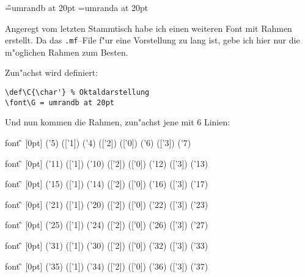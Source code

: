 \newpage\setcounter{page}{1}
\parindent=0pt \parskip=0pt
\font\G=umrandb at 20pt
\font\F=umranda at 20pt
\fussy
{}
\def\C{\char'}

Angeregt vom letzten Stammtisch habe ich einen weiteren Font mit Rahmen
erstellt. Da das {\tt .mf}--File f"ur eine Vorstellung zu lang ist,
gebe ich hier nur die m"oglichen Rahmen zum Besten.

Zun"achst wird definiert:
\begin{verbatim}
\def\C{\char'} % Oktaldarstellung
\font\G = umrandb at 20pt
\end{verbatim}
Und nun kommen die Rahmen, zun"achst jene mit 6 Linien:\vskip 2mm

\begin{bsp}
         font {\G} [0pt]
         (\C5) ([\C1]) (\C4)
         ([\C2])        ([\C0])
         (\C6) ([\C3]) (\C7)
\end{bsp}
\make

\begin{bsp}
         font {\G} [0pt]
         (\C11) ([\C1]) (\C10)
         ([\C2])        ([\C0])
         (\C12) ([\C3]) (\C13)
\end{bsp}
\make

\begin{bsp}
         font {\G} [0pt]
         (\C15) ([\C1]) (\C14)
         ([\C2])        ([\C0])
         (\C16) ([\C3]) (\C17)
\end{bsp}
\make

\begin{bsp}
         font {\G} [0pt]
         (\C21) ([\C1]) (\C20)
         ([\C2])        ([\C0])
         (\C22) ([\C3]) (\C23)
\end{bsp}
\make

\begin{bsp}
         font {\G} [0pt]
         (\C25) ([\C1]) (\C24)
         ([\C2])        ([\C0])
         (\C26) ([\C3]) (\C27)
\end{bsp}
\make

\begin{bsp}
         font {\G} [0pt]
         (\C31) ([\C1]) (\C30)
         ([\C2])        ([\C0])
         (\C32) ([\C3]) (\C33)
\end{bsp}
\make

\begin{bsp}
         font {\G} [0pt]
         (\C35) ([\C1]) (\C34)
         ([\C2])        ([\C0])
         (\C36) ([\C3]) (\C37)
\end{bsp}
\make


